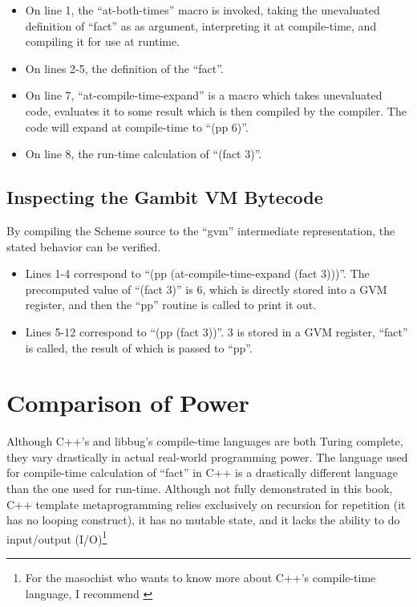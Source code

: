  \begin{itemize}
   \item
      On line 1, the ``at-both-times'' macro is invoked, taking the unevaluated
      definition of ``fact'' as
      as argument, interpreting it at compile-time, and compiling it for use at runtime.
   \item
      On lines 2-5, the definition of the ``fact''.
   \item
      On line 7, ``at-compile-time-expand'' is a macro which takes unevaluated code,
      evaluates it to some result which is then compiled by the compiler.  The code
      will expand at compile-time to ``(pp 6)''.
   \item
      On line 8, the run-time calculation of ``(fact 3)''.
 \end{itemize}

 \subsection{Inspecting the Gambit VM Bytecode}
 By compiling the Scheme source to the ``gvm'' intermediate
 representation, the stated behavior can be verified.


 \begin{itemize}
   \item
      Lines 1-4 correspond to ``(pp (at-compile-time-expand (fact 3)))''.  The precomputed
      value of ``(fact 3)'' is 6, which is directly stored into a GVM register, and
      then the ``pp'' routine is called to print it out.
   \item
      Lines 5-12 correspond to ``(pp (fact 3))''.  3 is stored in a GVM register, ``fact''
      is called, the result of which is passed to ``pp''.
 \end{itemize}

 \section{Comparison of Power}

 Although C++'s and libbug's compile-time languages are both Turing complete,
 they vary drastically in actual real-world programming power.  The language used
 for compile-time calculation of ``fact'' in C++ is a drastically different language than
 the one used for run-time.  Although not fully demonstrated in this book,
 C++ template metaprogramming relies exclusively on recursion for repetition (it has no
 looping construct), it has no mutable state, and it lacks the ability to do input/output
 (I/O)\footnote{For the masochist who wants to know more about C++'s compile-time language,
 I recommend \cite{ctm} }

